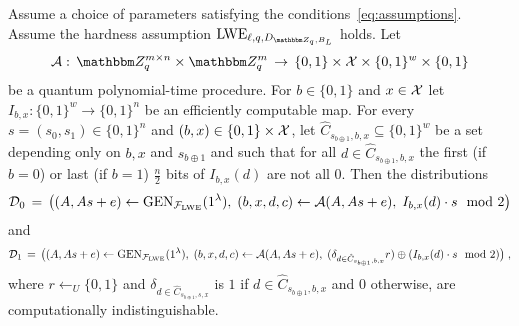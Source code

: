 \begin{lemma}\label{lem:lweadaptiveleakage}
Assume a choice of parameters satisfying the conditions~\eqref{eq:assumptions}. Assume the hardness assumption $\lwe_{\ell,q,D_{\mZ_q,B_L}}$ holds. Let
$$\mathcal{A}:\, \mZ_q^{m\times n} \times \mZ_q^m \,\to\,\{0,1\}\times \sX \times \{0,1\}^w \times\{0,1\}$$
be a quantum polynomial-time procedure. For $b\in\{0,1\}$ and $x\in\mathcal{X}$ let $I_{b,x}:\{0,1\}^w \to \{0,1\}^n$ be an efficiently computable map. For every $s = (s_0,s_1)\in\{0,1\}^n$ and $(b,x)\in\{0,1\}\times\mathcal{X}$, let $\hat{C}_{s_{b\oplus 1},b,x}\subseteq \{0,1\}^w$ be a set depending only on $b,x$ and $s_{b\oplus 1}$ and such that for all $d\in \hat{C}_{s_{b\oplus 1},b,x}$ the first (if $b=0$) or last (if $b=1$) $\frac{n}{2}$ bits of $I_{b,x}(d)$ are not all $0$.
 Then the distributions
\begin{eqnarray}\label{eq:l14-1}
\mathcal{D}_0 \,=\, \big( (\*A,\*A\*s+\*e) \leftarrow \textrm{GEN}_{\mathcal{F}_{\lwe}}(1^{\lambda}) ,\; (b,x,d,c) \leftarrow \mathcal{A}(\*A,\*A\*s+\*e),\; I_{b,x}(d) \cdot s \mod 2\big) 
\end{eqnarray}
and
\begin{eqnarray}\label{eq:l14-2}
\mathcal{D}_1 \,=\, \big( (\*A,\*A\*s+\*e) \leftarrow \textrm{GEN}_{\mathcal{F}_{\lwe}}(1^{\lambda}) ,\;(b,x,d,c) \leftarrow \mathcal{A}(\*A,\*A\*s+\*e), \; (\delta_{d\in \hat{C}_{s_{b\oplus 1},b,x}} r) \oplus (I_{b,x}(d) \cdot s\mod 2) \big)\;, 
\end{eqnarray}
where $r\leftarrow_U \{0,1\}$ and $\delta_{d\in \hat{C}_{s_{b\oplus 1},s,x}}$ is $1$ if $d\in \hat{C}_{s_{b\oplus 1},b,x}$ and $0$ otherwise, are computationally indistinguishable. 
\end{lemma}

